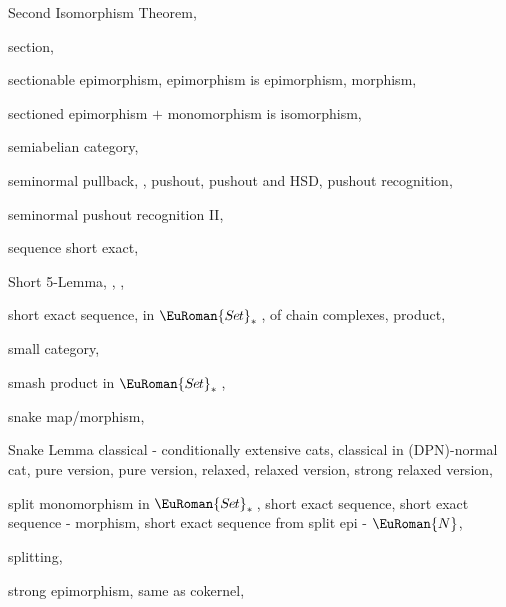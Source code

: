 \documentclass [12pt,oneside]{book}%
\theoremstyle{captionstyle}  %
\newcommand{\SetsBsd}{\EuRoman{S{\kern-0.12ex}e{\hskip-0.14ex}t}_{\ast}\,}	%
\newcommand{\NTag}{ - {\color{Brown} $\EuRoman{N}$}}																				%
\newcommand{\DPNInline}{(DPN)}																%
\begin{document}
\begin{theindex}
    \item Second Isomorphism Theorem, 
    \item section, 
    \item sectionable
    \subitem epimorphism, 
    \subitem epimorphism is epimorphism, 
    \subitem morphism, 
    \item sectioned epimorphism
    \subitem $+$ monomorphism is isomorphism, 
    \item semiabelian category, 
    \item seminormal
    \subitem pullback, , 
    \subitem pushout, 
    \subitem pushout and HSD, 
    \subitem pushout recognition, 
    \item seminormal pushout
    \subitem recognition II, 
    \item sequence
    \subitem short exact, 
    \item Short 5-Lemma, , , 
    \item short exact sequence, 
    \subitem in $\SetsBsd $, 
    \subitem of chain complexes, 
    \subitem product, 
    \item small
    \subitem category, 
    \item smash product
    \subitem in $\SetsBsd $, 
    \item snake
    \subitem map/morphism, 
    \item Snake Lemma
    \subitem classical - conditionally extensive cats, 
    \subitem classical in \DPNInline -normal cat, 
    \subitem pure version, 
    \subitem pure version, relaxed, 
    \subitem relaxed version, 
    \subitem strong relaxed version, 
    \item split
    \subitem monomorphism in $\SetsBsd $, 
    \subitem short exact sequence, 
    \subitem short exact sequence - morphism, 
    \subitem short exact sequence from split epi\NTag , 
    \item splitting, 
    \item strong epimorphism, 
    \subitem same as cokernel, 

\end{theindex}
\end{document}
